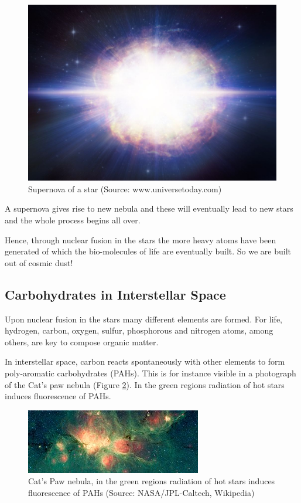 \documentclass[
  11pt,
]{book}
\begin{document}
\begin{figure}

{\centering \includegraphics[width=0.5\linewidth]{./figs/hires} 

}

\caption{Supernova of a star (Source:  www.universetoday.com)}\label{fig:supernova}
\end{figure}

A supernova gives rise to new nebula and these will eventually lead to new stars and the whole process begins all over.

Hence, through nuclear fusion in the stars the more heavy atoms have been generated of which the bio-molecules of life are eventually built. So we are built out of cosmic dust!

\newpage

\hypertarget{carbohydrates-in-interstellar-space}{%
\subsection{Carbohydrates in Interstellar Space}\label{carbohydrates-in-interstellar-space}}

Upon nuclear fusion in the stars many different elements are formed. For life, hydrogen, carbon, oxygen, sulfur, phosphorous and nitrogen atoms, among others, are key to compose organic matter.

In interstellar space, carbon reacts spontaneously with other elements to form poly-aromatic carbohydrates (PAHs). This is for instance visible in a photograph of the Cat's paw nebula (Figure \ref{fig:catPawNebula}). In the green regions radiation of hot stars induces fluorescence of PAHs.

\begin{figure}

{\centering \includegraphics[width=0.5\linewidth]{./figs/orionWithPAH} 

}

\caption{Cat's Paw nebula, in the green regions radiation of hot stars induces fluorescence of PAHs (Source: NASA/JPL-Caltech, Wikipedia)}\label{fig:catPawNebula}
\end{figure}
\end{document}
